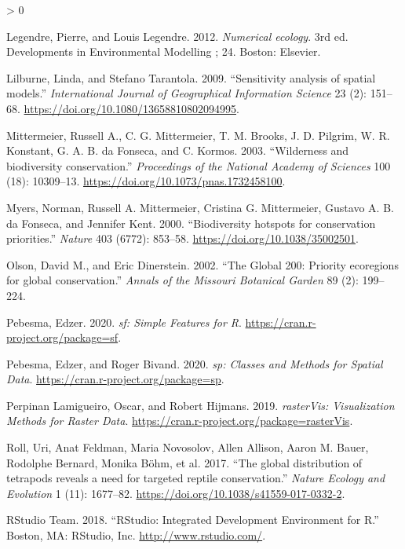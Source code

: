 \documentclass[
]{article}
\newlength{\cslhangindent}
\newenvironment{CSLReferences}[2] %
 {%
  \setlength{\parindent}{0pt}
  \ifodd #1 \everypar{\setlength{\hangindent}{\cslhangindent}}\ignorespaces\fi
  \ifnum #2 > 0
  \setlength{\parskip}{#2\baselineskip}
  \fi
 }%
 {}
\begin{document}
\begin{CSLReferences}{1}{0}
\leavevmode\hypertarget{ref-Legendre2012}{}%
Legendre, Pierre, and Louis Legendre. 2012. \emph{{Numerical ecology}}. 3rd ed. Developments in Environmental Modelling ; 24. Boston: Elsevier.

\leavevmode\hypertarget{ref-Lilburne2009}{}%
Lilburne, Linda, and Stefano Tarantola. 2009. {``{Sensitivity analysis of spatial models}.''} \emph{International Journal of Geographical Information Science} 23 (2): 151--68. \url{https://doi.org/10.1080/13658810802094995}.

\leavevmode\hypertarget{ref-Mittermeier2003}{}%
Mittermeier, Russell A., C. G. Mittermeier, T. M. Brooks, J. D. Pilgrim, W. R. Konstant, G. A. B. da Fonseca, and C. Kormos. 2003. {``{Wilderness and biodiversity conservation}.''} \emph{Proceedings of the National Academy of Sciences} 100 (18): 10309--13. \url{https://doi.org/10.1073/pnas.1732458100}.

\leavevmode\hypertarget{ref-Myers2000}{}%
Myers, Norman, Russell A. Mittermeier, Cristina G. Mittermeier, Gustavo A. B. da Fonseca, and Jennifer Kent. 2000. {``{Biodiversity hotspots for conservation priorities}.''} \emph{Nature} 403 (6772): 853--58. \url{https://doi.org/10.1038/35002501}.

\leavevmode\hypertarget{ref-Olson2002}{}%
Olson, David M., and Eric Dinerstein. 2002. {``{The Global 200: Priority ecoregions for global conservation}.''} \emph{Annals of the Missouri Botanical Garden} 89 (2): 199--224.

\leavevmode\hypertarget{ref-R-sf}{}%
Pebesma, Edzer. 2020. \emph{{sf: Simple Features for R}}. \url{https://cran.r-project.org/package=sf}.

\leavevmode\hypertarget{ref-R-sp}{}%
Pebesma, Edzer, and Roger Bivand. 2020. \emph{{sp: Classes and Methods for Spatial Data}}. \url{https://cran.r-project.org/package=sp}.

\leavevmode\hypertarget{ref-R-rasterVis}{}%
Perpinan Lamigueiro, Oscar, and Robert Hijmans. 2019. \emph{{rasterVis: Visualization Methods for Raster Data}}. \url{https://cran.r-project.org/package=rasterVis}.

\leavevmode\hypertarget{ref-Roll2017}{}%
Roll, Uri, Anat Feldman, Maria Novosolov, Allen Allison, Aaron M. Bauer, Rodolphe Bernard, Monika Böhm, et al. 2017. {``{The global distribution of tetrapods reveals a need for targeted reptile conservation}.''} \emph{Nature Ecology and Evolution} 1 (11): 1677--82. \url{https://doi.org/10.1038/s41559-017-0332-2}.

\leavevmode\hypertarget{ref-RStudioTeam2018}{}%
RStudio Team. 2018. {``{RStudio: Integrated Development Environment for R}.''} Boston, MA: RStudio, Inc. \url{http://www.rstudio.com/}.


\end{CSLReferences}
\end{document}

